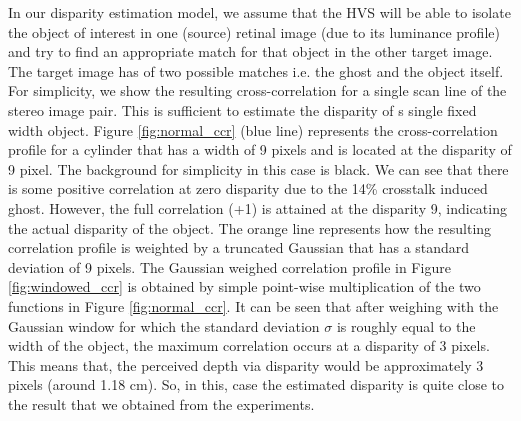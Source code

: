 In our disparity estimation model, we assume that the HVS will be able to isolate the object of interest in one (source) retinal image (due to its luminance profile) and try to find an appropriate match for that object in the other target image. The target image has of two possible matches i.e. the ghost and the object itself. For simplicity, we show the resulting cross-correlation for a single scan line of the stereo image pair. This is sufficient to estimate the disparity of s single fixed width object. Figure \ref{fig:normal_ccr} (blue line) represents the cross-correlation profile for a cylinder that has a width of 9 pixels and is located at the disparity of 9 pixel. The background for simplicity in this case is black. We can see that there is some positive correlation at zero disparity due to the 14\% crosstalk induced ghost. However, the full correlation (+1) is attained at the disparity 9, indicating the actual disparity of the object. The orange line represents how the resulting correlation profile is weighted by a truncated Gaussian that has a standard deviation of 9 pixels. The Gaussian weighed correlation profile in Figure \ref{fig:windowed_ccr} is obtained by simple point-wise multiplication of the two functions in Figure \ref{fig:normal_ccr}. It can be seen that after weighing with the Gaussian window for which the standard deviation $\sigma$ is roughly equal to the width of the object, the maximum correlation occurs at a disparity of 3 pixels. This means that, the perceived depth via disparity would be approximately 3 pixels (around 1.18 cm). So, in this, case the estimated disparity is quite close to the result that we obtained from the experiments.

